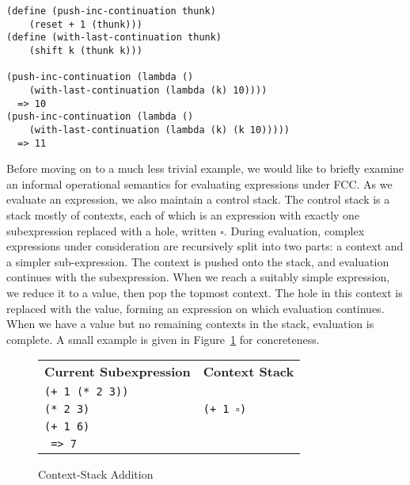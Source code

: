 \documentclass[11pt]{article}
\begin{document}
\begin{verbatim}
(define (push-inc-continuation thunk)
    (reset + 1 (thunk)))
(define (with-last-continuation thunk)
    (shift k (thunk k)))

(push-inc-continuation (lambda ()
    (with-last-continuation (lambda (k) 10))))
  => 10
(push-inc-continuation (lambda ()
    (with-last-continuation (lambda (k) (k 10)))))
  => 11
\end{verbatim}

Before moving on to a much less trivial example, we would like to briefly examine an informal operational semantics for evaluating expressions under FCC.
As we evaluate an expression, we also maintain a control stack.
The control stack is a stack mostly of contexts, each of which is an expression with exactly one subexpression replaced with a hole, written $\square$.
During evaluation, complex expressions under consideration are recursively split into two parts: a context and a simpler sub-expression.
The context is pushed onto the stack, and evaluation continues with the subexpression.
When we reach a suitably simple expression, we reduce it to a value, then pop the topmost context.
The hole in this context is replaced with the value, forming an expression on which evaluation continues.
When we have a value but no remaining contexts in the stack, evaluation is complete.
A small example is given in Figure~\ref{fig:context-stack-addition} for concreteness.

\begin{figure}
\caption{Context-Stack Addition}
\label{fig:context-stack-addition}
\begin{tabular}{ll}
\textbf{Current Subexpression} & \textbf{Context Stack} \\
\texttt{(+ 1 (* 2 3))} & \\
\texttt{(* 2 3)} & \texttt{(+ 1 $\square$)} \\
\texttt{(+ 1 6)} & \\
\texttt{ => 7} & \\
\end{tabular}
\end{figure}
\end{document}

